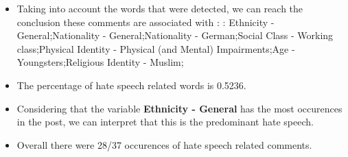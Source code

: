 \documentclass[11pt]{article}
\begin{document}
\begin{itemize}\item Taking into account the words that were detected, we can reach the conclusion these comments are associated with : : Ethnicity - General;Nationality - General;Nationality - German;Social Class - Working class;Physical Identity - Physical (and Mental) Impairments;Age - Youngsters;Religious Identity - Muslim;%

\item The percentage of hate speech related words is 0.5236.

\item Considering that the variable \textbf{Ethnicity - General} has the most occurences in the post, we can interpret that this is the predominant hate speech.

\item Overall there were 28/37 occurences of hate speech related comments.\end{itemize}
\end{document}

